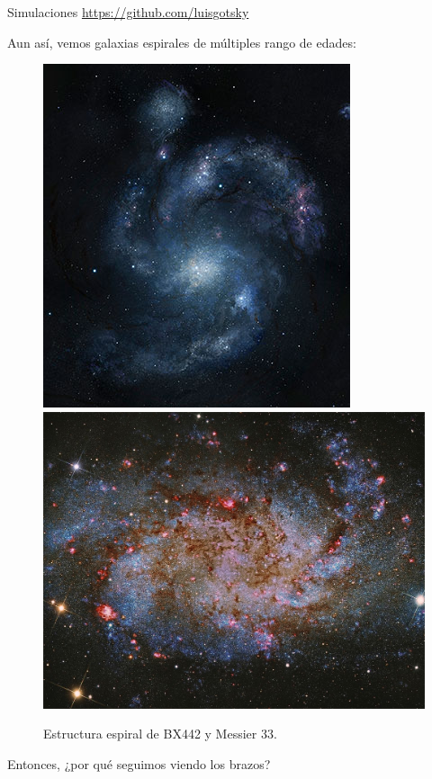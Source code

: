 \documentclass{beamer}
\begin{document}
\begin{frame}{Simulaciones}
\url{https://github.com/luisgotsky} \cite{github}
\end{frame}

\begin{frame}
Aun así, vemos galaxias espirales de múltiples rango de edades:

\begin{figure}[h!]
\label{fig2}
    \begin{center}
    \includegraphics[scale=0.23]{sn-spiral.jpg}
    \hspace{0.5cm}
    \includegraphics[scale=0.088]{Messier_33}
    \caption{Estructura espiral de BX442 y Messier 33.}
    \end{center}
\end{figure}

\begin{alertblock}{}
Entonces, ¿por qué seguimos viendo los brazos?
\end{alertblock}

\end{frame}
\end{document}
